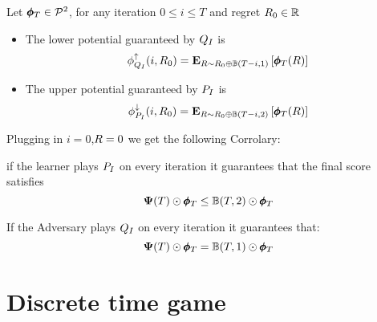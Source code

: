 \documentclass{article}[12pt]
\begin{document}
\begin{theorem} \label{thm:IntegerGameBounds}
  Let $\pmb{\phi}_{T} \in {\cal P}^{2}$, for any iteration $0 \leq i \leq T$ and
  regret $R_0 \in \mathbb{R}$ 
  \begin{itemize}
  \item
    The lower potential guaranteed by $Q_I$ is
     $$\phi_{Q_I}^{\uparrow}(i,R_0) = {\bf E}_{R \sim R_0 \oplus \mathbb{B}(T-i,1)}\left[ \pmb{\phi}_{T}(R) \right] $$
  \item
    The upper potential guaranteed by $P_I$ is
    $$\phi_{P_I}^{\downarrow}(i,R_0) = {\bf E}_{R \sim R_0 \oplus \mathbb{B}(T-i,2)}\left[ \pmb{\phi}_{T}(R) \right]$$
  \end{itemize}
\end{theorem}

Plugging in $i=0$,$R=0$ we get the following Corrolary:
\begin{corollary}
  if the learner plays $P_I$ on every iteration
  it guarantees that the final score satisfies
  $${\bf \Psi}(T) \odot \pmb{\phi}_{T} \leq \mathbb{B}(T,2) \odot \pmb{\phi}_{T} $$

  If the Adversary plays $Q_I$ on every iteration it guarantees
  that:
  $${\bf \Psi}(T) \odot \pmb{\phi}_{T} = \mathbb{B}(T,1) \odot \pmb{\phi}_{T} $$
\end{corollary}


\section{Discrete time game}
\end{document}
